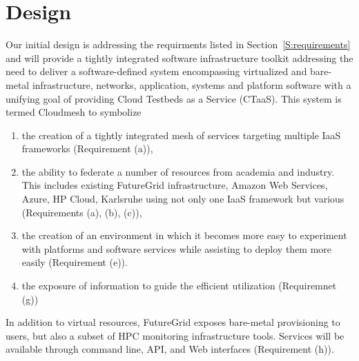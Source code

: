 \documentclass{tex/sig-alternate-2013}
\newcommand{\todo}[1]{{\color{red}{#1}}}
\newcommand{\READ}{\todo{READ}}
\begin{document}
\section{Design \READ}\label{S:design}

Our initial design is addressing the requirments listed in
Section~\ref{S:requirements} and will provide a
tightly integrated software infrastructure toolkit addressing the need to
deliver a software-defined system encompassing virtualized and
bare-metal infrastructure, networks, application, systems and platform
software with a unifying goal of providing Cloud Testbeds as a Service
(CTaaS). This system is termed Cloudmesh to symbolize

\begin{enumerate}[leftmargin=*,itemsep=0pt,topsep=0pt]

\item the creation of a tightly integrated mesh of services targeting
  multiple IaaS frameworks (Requirement (a)), 

\item the ability to federate a number of resources from academia and
  industry. This includes existing FutureGrid infrastructure, Amazon
  Web Services, Azure, HP Cloud, Karlsruhe using not only one IaaS
  framework but various (Requirements (a), (b), (c)),

\item the creation of an environment in which it becomes more easy to
  experiment with platforms and software services while assisting to
  deploy them more easily (Requirement (e)).  

\item the exposure of information to guide the efficient utilization
  (Requiremnet (g))

\end{enumerate}

In addition to virtual resources, FutureGrid exposes bare-metal
provisioning to users, but also a subset of HPC monitoring
infrastructure tools. Services will be available through command line,
API, and Web interfaces (Requirement (h)).
\end{document}
